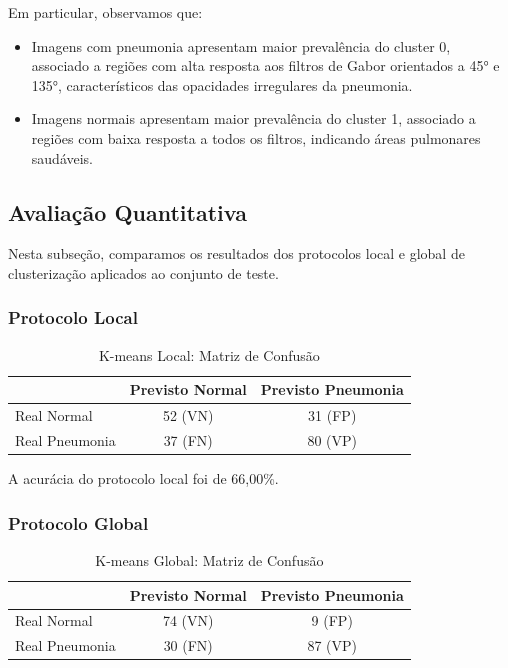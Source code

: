 \documentclass[sigconf,nonacm]{acmart}
\begin{document}
Em particular, observamos que:

\begin{itemize}
  \item Imagens com pneumonia apresentam maior prevalência do cluster 0, associado a regiões com alta resposta aos filtros de Gabor orientados a 45° e 135°, característicos das opacidades irregulares da pneumonia.
  \item Imagens normais apresentam maior prevalência do cluster 1, associado a regiões com baixa resposta a todos os filtros, indicando áreas pulmonares saudáveis.
\end{itemize}

\subsection{Avaliação Quantitativa}
Nesta subseção, comparamos os resultados dos protocolos local e global de clusterização aplicados ao conjunto de teste.

\subsubsection{Protocolo Local}
\noindent

\begin{table}[!h]
  \centering
  \caption{K-means Local: Matriz de Confusão}
  \label{tab:conf_local}
  \begin{tabular}{lcc}
    \toprule
                   & Previsto Normal & Previsto Pneumonia \\
    \midrule
    Real Normal     & 52 (VN)         & 31 (FP)           \\
    Real Pneumonia  & 37 (FN)         & 80 (VP)           \\
    \bottomrule
  \end{tabular}
\end{table}

A acurácia do protocolo local foi de 66,00\%.

\subsubsection{Protocolo Global}
\noindent

\begin{table}[!h]
  \centering
  \caption{K-means Global: Matriz de Confusão}
  \label{tab:conf_global}
  \begin{tabular}{lcc}
    \toprule
                   & Previsto Normal & Previsto Pneumonia \\
    \midrule
    Real Normal     & 74 (VN)         & 9 (FP)            \\
    Real Pneumonia  & 30 (FN)         & 87 (VP)           \\
    \bottomrule
  \end{tabular}
\end{table}
\end{document}

